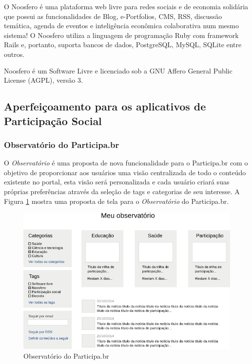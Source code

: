 \documentclass[12pt]{article}
\begin{document}
O Noosfero\cite{noosfero} é uma plataforma web livre para redes sociais e de
economia solidária que possui as funcionalidades de Blog, e-Portfolios, CMS,
RSS, discussão temática, agenda de eventos e inteligência econômica
colaborativa num mesmo sistema! O Noosfero utiliza a linguagem de programação
Ruby com framework Rails e, portanto, suporta bancos de dados, PostgreSQL,
MySQL, SQLite entre outros.

Noosfero é um Software Livre e licenciado sob a GNU Affero General Public
License (AGPL), versão 3.

\subsection{Aperfeiçoamento para os aplicativos de Participação Social}

\subsubsection{Observatório do Participa.br}

O {\it Observatório} é uma proposta de nova funcionalidade para o Participa.br com o
objetivo de proporcionar aos usuários uma visão centralizada de todo o
conteúdo existente no portal, esta visão será personalizada e cada usuário
criará suas próprias preferências através da seleção de tags e categorias de
seu interesse. A Figura \ref{observatorio} mostra uma proposta de tela para o
{\it Observatório} do Participa.br.

\begin{figure}[h!]
\center
\includegraphics[scale=0.60]{observatorio.png}
\caption{Observatório do Participa.br}
\label{observatorio}
\end{figure}
\end{document}
